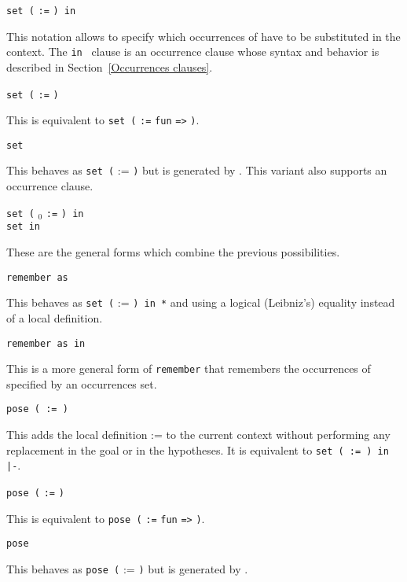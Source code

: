 \begin{Variants}

\item {\tt set (} {\ident} {\tt :=} {\term} {\tt ) in {\occgoalset}}

This notation allows to specify which occurrences of {\term} have to
be substituted in the context. The {\tt in {\occgoalset}} clause is an
occurrence clause whose syntax and behavior is described in
Section~\ref{Occurrences clauses}.

\item {\tt set (} {\ident} \nelist{\binder}{} {\tt :=} {\term} {\tt )}

  This is equivalent to {\tt set (} {\ident} {\tt :=} {\tt fun}
  \nelist{\binder}{} {\tt =>} {\term} {\tt )}.

\item {\tt set } {\term}

  This behaves as {\tt set (} {\ident} := {\term} {\tt )} but {\ident}
  is generated by {\Coq}. This variant also supports an occurrence clause.

\item {\tt set (} {\ident$_0$} \nelist{\binder}{} {\tt :=} {\term}
      {\tt ) in {\occgoalset}}\\
      {\tt set {\term} in {\occgoalset}}

  These are the general forms which combine the previous possibilities.

\item {\tt remember {\term} {\tt as} {\ident}}

  This behaves as {\tt set (} {\ident} := {\term} {\tt ) in *} and using a
  logical (Leibniz's) equality instead of a local definition.

\item {\tt remember {\term} {\tt as} {\ident} in {\occgoalset}}

  This is a more general form of {\tt remember} that remembers the
  occurrences of {\term} specified by an occurrences set.

\item {\tt pose (  {\ident} {\tt :=} {\term} {\tt )}}
  
  This adds the local definition {\ident} := {\term} to the current
  context without performing any replacement in the goal or in the
  hypotheses. It is equivalent to {\tt set ( {\ident} {\tt :=}
  {\term} {\tt ) in |-}}.

\item {\tt pose (} {\ident} \nelist{\binder}{} {\tt :=} {\term} {\tt )}

  This is equivalent to {\tt pose (} {\ident} {\tt :=} {\tt fun}
  \nelist{\binder}{} {\tt =>} {\term} {\tt )}.

\item{\tt pose {\term}}

  This behaves as {\tt pose (} {\ident} := {\term} {\tt )} but
  {\ident} is generated by {\Coq}.

\end{Variants}

